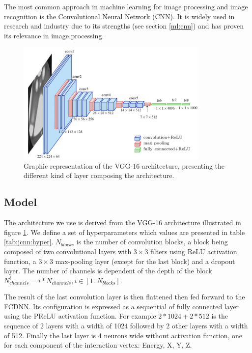 The most common approach in machine learning for image processing and image recognition is the Convolutional Neural Network (CNN). It is widely used in research and industry \cite{simonyan_very_2015, ciresan_multi-column_2012, abbasi_convolutional_2021, maksimovic_cnns_2021} due to its strengths (see section \ref{ml:cnn}) and has proven its relevance in image processing.

\begin{figure}[ht]
  \centering
  \includegraphics[height=6cm]{images/jcnn/vgg16.png}
  \caption{Graphic representation of the VGG-16 architecture, presenting the different kind of layer composing the architecture.}
  \label{fig:jcnn:vgg16}
\end{figure}

\subsection{Model}

The architecture we use is derived from the VGG-16 architecture \cite{simonyan_very_2015} illustrated in figure \ref{fig:jcnn:vgg16}. We define a set of hyperparameters which values are presented in table \ref{tab:jcnn:hyper}. $N_{blocks}$ is the number of convolution blocks, a block being composed of two convolutional layers with $3\times3$ filters using ReLU activation function, a $3\times3$ max-pooling layer (except for the last block) and a dropout layer. The number of channels is dependent of the depth of the block $N^i_{channels} = i * N_{channels}, i \in [1..N_{blocks}]$.

The result of the last convolution layer is then flattened then fed forward to the FCDNN. Its configuration is expressed as a sequential of fully connected layer using the PReLU activation function. For example $2 * 1024 + 2 * 512$ is the sequence of 2 layers with a width of 1024 followed by 2 other layers with a width of 512. Finally the last layer is 4 neurons wide without activation function, one for each component of the interaction vertex: Energy, X, Y, Z.

